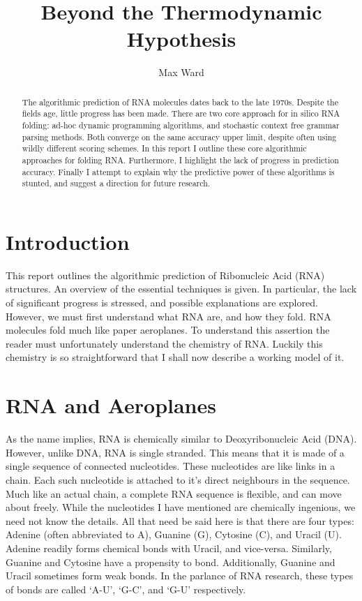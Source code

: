 \documentclass[12pt, a4paper]{article}
\title{Beyond the Thermodynamic Hypothesis}
\author{Max Ward}
\begin{document}
\maketitle

\begin{abstract}
The algorithmic prediction of RNA molecules dates back to the late 1970s. Despite the fields age, little progress has been made. There are two core approach for in silico RNA folding: ad-hoc dynamic programming algorithms, and stochastic context free grammar parsing methods. Both converge on the same accuracy upper limit, despite often using wildly different scoring schemes. In this report I outline these core algorithmic approaches for folding RNA. Furthermore, I highlight the lack of progress in prediction accuracy. Finally I attempt to explain why the predictive power of these algorithms is stunted, and suggest a direction for future research.
\end{abstract}

\clearpage

\tableofcontents
\listoffigures
\clearpage

\section{Introduction}
This report outlines the algorithmic prediction of Ribonucleic Acid (RNA) structures. An overview of the essential techniques is given. In particular, the lack of significant progress is stressed, and possible explanations are explored. However, we must first understand what RNA are, and how they fold. RNA molecules fold much like paper aeroplanes. To understand this assertion the reader must unfortunately understand the chemistry of RNA. Luckily this chemistry is so straightforward that I shall now describe a working model of it.

\section{RNA and Aeroplanes} 
As the name implies, RNA is chemically similar to Deoxyribonucleic Acid (DNA). However, unlike DNA, RNA is single stranded. This means that it is made of a single sequence of connected nucleotides. These nucleotides are like links in a chain. Each such nucleotide is attached to it's direct neighbours in the sequence. Much like an actual chain, a complete RNA sequence is flexible, and can move about freely. While the nucleotides I have mentioned are chemically ingenious, we need not know the details. All that need be said here is that there are four types: Adenine (often abbreviated to A), Guanine (G), Cytosine (C), and Uracil (U). Adenine readily forms chemical bonds with Uracil, and vice-versa. Similarly, Guanine and Cytosine have a propensity to bond. Additionally, Guanine and Uracil sometimes form weak bonds. In the parlance of RNA research, these types of bonds are called `A-U', `G-C', and `G-U' respectively.
\end{document}
